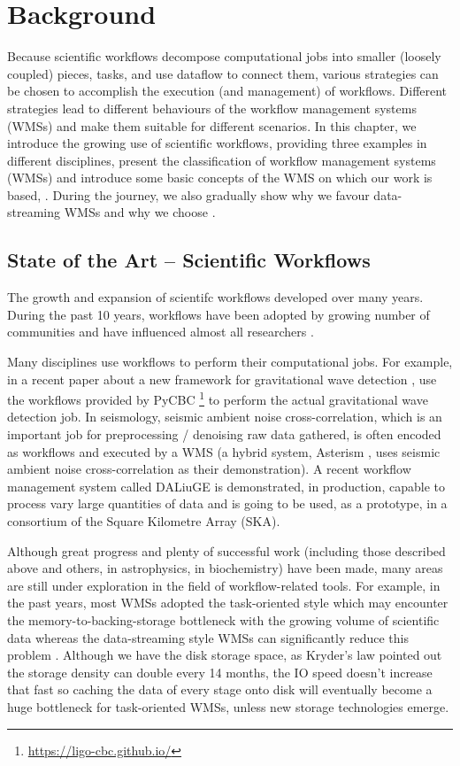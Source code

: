 \chapter{Background}
Because scientific workflows decompose computational jobs into smaller (loosely coupled) pieces, tasks, and use dataflow to connect them, various strategies can be chosen to accomplish the execution (and management) of workflows. Different strategies lead to different behaviours of the workflow management systems (WMSs) and make them suitable for different scenarios. In this chapter, we introduce the growing use of scientific workflows, providing three examples in different disciplines, present the classification of workflow management systems (WMSs) and introduce some basic concepts of the WMS on which our work is based, \dpy. During the journey, we also gradually show why we favour data-streaming WMSs and why we choose \dpy.

\section{State of the Art -- Scientific Workflows}
The growth and expansion of scientifc workflows developed over many years. During the past 10 years, workflows have been adopted by growing number of communities and have influenced almost all researchers \cite{ATKINSON2017216}.

Many disciplines use workflows to perform their computational jobs. For example, in a recent paper about a new framework for gravitational wave detection \cite{gwave}, \citeauthor{gwave} use the workflows provided by PyCBC \footnote{\url{https://ligo-cbc.github.io/}} to perform the actual gravitational wave detection job. In seismology, seismic ambient noise cross-correlation, which is an important job for preprocessing / denoising raw data gathered, is often encoded as workflows and executed by a WMS (\eg a hybrid system, Asterism \cite{Asterism}, uses seismic ambient noise cross-correlation as their demonstration). A recent workflow management system called DALiuGE \cite{wu2017daliuge} is demonstrated, in production, capable to process vary large quantities of data and is going to be used, as a prototype, in a consortium of the Square Kilometre Array (SKA).

Although great progress and plenty of successful work (including those described above and others, \eg \cite{berriman2007generating} \cite{berriman2010application} in astrophysics, \cite{aiche2015workflows} in biochemistry) have been made, many areas are still under exploration in the field of workflow-related tools. For example, in the past years, most WMSs adopted the task-oriented style which may encounter the memory-to-backing-storage bottleneck with the growing volume of scientific data whereas the data-streaming style WMSs can significantly reduce this problem \cite{doi:10.1177/1094342016649766}. Although we have the disk storage space, as Kryder’s law \citep{Kryders_law} pointed out the storage density can double every 14 months, the IO speed doesn't increase that fast so caching the data of every stage onto disk will eventually become a huge bottleneck for task-oriented WMSs, unless new storage technologies emerge.

